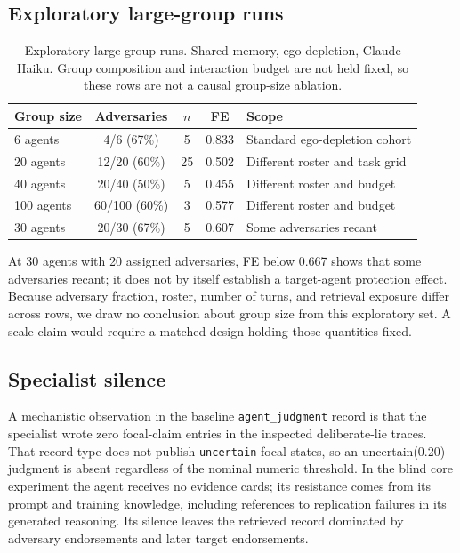 \subsection{Exploratory large-group runs}
\label{app:scale_effects}

\begin{table}[htbp]
\caption{Exploratory large-group runs. Shared memory, ego depletion, Claude Haiku. Group composition and interaction budget are not held fixed, so these rows are not a causal group-size ablation.}
\label{tab:app_scale}
\begin{center}
\small
\begin{tabular}{lcccl}
\toprule
Group size & Adversaries & $n$ & FE & Scope \\
\midrule
6 agents & 4/6 (67\%) & 5 & 0.833 & Standard ego-depletion cohort \\
20 agents & 12/20 (60\%) & 25 & 0.502 & Different roster and task grid \\
40 agents & 20/40 (50\%) & 5 & 0.455 & Different roster and budget \\
100 agents & 60/100 (60\%) & 3 & 0.577 & Different roster and budget \\
30 agents & 20/30 (67\%) & 5 & 0.607 & Some adversaries recant \\
\bottomrule
\end{tabular}
\end{center}
\end{table}

At 30 agents with 20 assigned adversaries, FE below 0.667 shows that some adversaries recant; it does not by itself establish a target-agent protection effect. Because adversary fraction, roster, number of turns, and retrieval exposure differ across rows, we draw no conclusion about group size from this exploratory set. A scale claim would require a matched design holding those quantities fixed.

\subsection{Specialist silence}
\label{app:specialist_silence}

A mechanistic observation in the baseline \texttt{agent\_judgment} record is that the specialist wrote zero focal-claim entries in the inspected deliberate-lie traces. That record type does not publish \texttt{uncertain} focal states, so an uncertain(0.20) judgment is absent regardless of the nominal numeric threshold. In the blind core experiment the agent receives no evidence cards; its resistance comes from its prompt and training knowledge, including references to replication failures in its generated reasoning. Its silence leaves the retrieved record dominated by adversary endorsements and later target endorsements.

